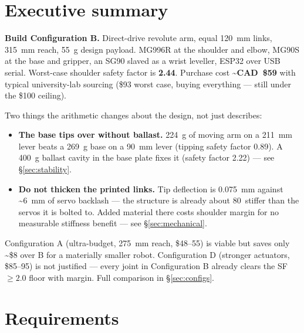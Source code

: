 \documentclass[11pt]{article}
\begin{document}
\tableofcontents
\newpage

\section{Executive summary}

\textbf{Build Configuration B.} Direct-drive revolute arm, equal 120~mm links, 315~mm reach, 55~g design payload. MG996R at the shoulder and elbow, MG90S at the base and gripper, an SG90 slaved as a wrist leveller, ESP32 over USB serial. Worst-case shoulder safety factor is \textbf{2.44}. Purchase cost \textbf{\textasciitilde CAD~\$59} with typical university-lab sourcing (\$93 worst case, buying everything --- still under the \$100 ceiling).

Two things the arithmetic changes about the design, not just describes:

\begin{itemize}
\item \textbf{The base tips over without ballast.} 224~g of moving arm on a 211~mm lever beats a 269~g base on a 90~mm lever (tipping safety factor 0.89). A 400~g ballast cavity in the base plate fixes it (safety factor 2.22) --- see \S\ref{sec:stability}.
\item \textbf{Do not thicken the printed links.} Tip deflection is 0.075~mm against \textasciitilde6~mm of servo backlash --- the structure is already about 80\texttimes\ stiffer than the servos it is bolted to. Added material there costs shoulder margin for no measurable stiffness benefit --- see \S\ref{sec:mechanical}.
\end{itemize}

Configuration A (ultra-budget, 275~mm reach, \$48--55) is viable but saves only \textasciitilde\$8 over B for a materially smaller robot. Configuration D (stronger actuators, \$85--95) is not justified --- every joint in Configuration B already clears the SF~$\geq 2.0$ floor with margin. Full comparison in \S\ref{sec:configs}.

\section{Requirements}
\label{sec:req}
\end{document}
